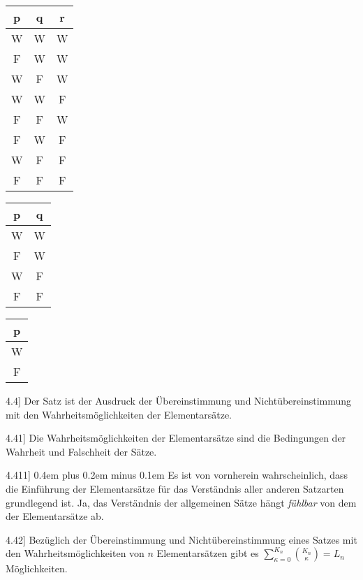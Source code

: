 \documentclass[12pt,oneside]{book}[2007/10/19]
\newcommand{\PropERef}[1]{\hyperref[PropE:#1]{#1}}
\newcommand{\PropositionG}[2]{%
  \item[\phantomsection\label{PropG:#1}\PropERef{#1}] #2%
}
\newcommand{\Emph}[1]{\emph{#1}}%
\newcommand{\Strut}[1][12pt]{\rule{0pt}{#1}}
\newcommand{\stretchyspace}{\spaceskip0.4em plus 0.2em minus 0.1em}
\begin{document}
\begin{propositions}
{\begin{center}
\begin{tabular}[t]{c|c|c}
p & q & r\\
\hline
\hline
\Strut W & W & W\\
\hline
\Strut F & W & W\\
\hline
\Strut W & F & W\\
\hline
\Strut W & W & F\\
\hline
\Strut F & F & W\\
\hline
\Strut F & W & F\\
\hline
\Strut W & F & F\\
\hline
\Strut F & F & F\\
\hline
\end{tabular}
\hspace{0.5cm}
\begin{tabular}[t]{c|c}
p & q\\
\hline
\hline
\Strut W & W\\
\hline
\Strut F & W\\
\hline
\Strut W & F\\
\hline
\Strut F & F\\
\hline
\end{tabular}
\hspace{0.5cm}
\begin{tabular}[t]{c}
p\\
\hline
\hline
\Strut W\\
\hline
\Strut F\\
\hline
\end{tabular}
\end{center}
}


\PropositionG{4.4}
{Der Satz ist der Ausdruck der Übereinstimmung
und Nichtübereinstimmung mit den Wahrheitsmöglichkeiten
der Elementarsätze.}


\PropositionG{4.41}
{Die Wahrheitsmöglichkeiten der Elementarsätze
sind die Bedingungen der Wahrheit und Falschheit
der Sätze.}


\PropositionG{4.411}
{{\stretchyspace
Es ist von vornherein wahrscheinlich, dass die
Einführung der Elementarsätze für das Verständnis
aller anderen Satzarten grundlegend ist. Ja, das
Verständnis der allgemeinen Sätze hängt \Emph{fühlbar}
von dem der Elementarsätze ab.}}


\PropositionG{4.42}
{Bezüglich der Übereinstimmung und Nichtübereinstimmung
eines Satzes mit den Wahrheitsmöglichkeiten
von $n$ Elementarsätzen gibt es
$\sum\limits_{\kappa = 0}^{K_n}\binom{K_n}{\kappa} = L_{n}$ Möglichkeiten.}



\end{propositions}
\end{document}
